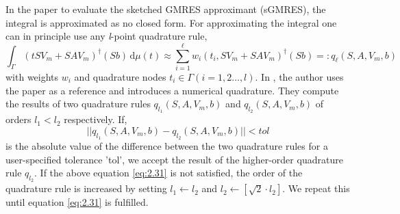 In the paper \cite{41} to evaluate the sketched GMRES approximant (sGMRES), the integral is approximated as no closed form. For approximating the integral one can in principle use any \textit{l}-point quadrature rule,
\begin{equation}
    \int_{\Gamma} \left( tSV_m + SAV_m \right)^{\dagger} (Sb) \, \mathrm{d}\mu(t) \approx \sum_{i=1}^{\ell} w_i(t_i, SV_m + SAV_m)^{\dagger} (Sb) =: q_\ell(S, A, V_m, b)
    \label{eq:2.30}
\end{equation}
with weights $w_i$ and quadrature nodes $t_i \in \Gamma (i = 1, 2\dots, l)$. In \cite{41}, the author uses the paper \cite{52} as a reference and introduces a numerical quadrature. They compute the results of two quadrature rules $q_{l_1}(S, A, V_m, b)$ and $q_{l_2}(S, A, V_m, b)$ of orders $l_1 < l_2$ respectively. If,
\begin{equation}
    ||q_{l_1}(S, A, V_m, b) - q_{l_2}(S, A, V_m, b)|| < tol
    \label{eq:2.31}
\end{equation}
is the absolute value of the difference between the two quadrature rules for a user-specified tolerance 'tol', we accept the result of the higher-order quadrature rule $q_{l_2}$. If the above equation \ref{eq:2.31} is not satisfied, the order of the quadrature rule is increased by setting $l_1 \leftarrow l_2$ and $l_2 \leftarrow [\sqrt{2} \cdot l_2]$. We repeat this until equation \ref{eq:2.31} is fulfilled.

